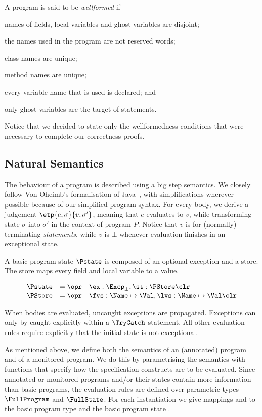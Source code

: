 A program is said to be \emph{wellformed} if 
\begin{inparaenum}
\item names of fields, local variables and ghost variables are
disjoint;
\item the names used in the program are not reserved words;
\item class names are unique;
\item method names are unique; 
\item every variable name that is used is declared; and
\item only ghost variables are the target of \Set statements.
\end{inparaenum}
Notice that we decided to state only the wellformedness conditions
that were necessary to complete our correctness proofs.

\subsection{Natural Semantics}\label{SecSemantics}
The behaviour of a program is described using a big step semantics. We
closely follow Von Oheimb's formalisation of Java~\cite{Oheimb01},
with simplifications wherever possible because of our simplified
program syntax. For every body, we derive a judgement
$\etp{e,\sigma}{v,\sigma'}$, meaning that  $e$
evaluates to $v$, while transforming state $\sigma$ into $\sigma'$ in
the context of program \(P\). Notice that \(v\) is \One for
(normally) terminating \emph{statements}, while \(v\) is \(\bot\) whenever
evaluation finishes in an exceptional state.

A basic program state \(\Pstate\) is composed of an optional exception
and a store.  The store maps every field and local variable to a
value.

\[
\begin{array}{rcl}
\Pstate & = \opr & \ex : \Excp_{\bot}, \st : \PStore \clr\\
\PStore & = \opr & \fvs : \Name \mapsto \Val, \lvs : \Name \mapsto \Val \clr
\end{array}
\]

When bodies are evaluated, uncaught exceptions are
propagated. Exceptions can only by caught explicitly within a
\(\TryCatch\) statement. All other evaluation rules require explicitly
that the initial state is not exceptional.

As mentioned above, we define both the semantics of an (annotated)
program and of a monitored program. We do this by parametrising the
semantics with functions that specify how the specification constructs
are to be evaluated. Since annotated or monitored programs and/or
their states contain more information than basic programs, the
evaluation rules are defined over parametric types
\(\FullProgram\) and \(\FullState\). For each instantiation we give
mappings \program and \progstate to the basic program type \Program
and the basic program state \Pstate.

